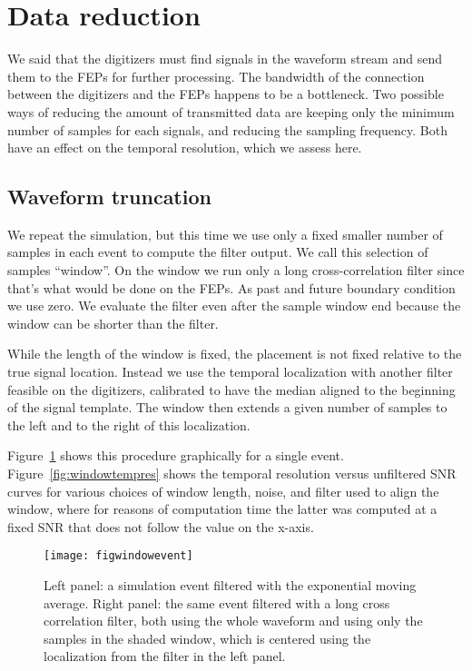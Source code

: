 \section{Data reduction}

We said that the digitizers must find signals in the waveform stream and send
them to the FEPs for further processing. The bandwidth of the connection
between the digitizers and the FEPs happens to be a bottleneck. Two possible
ways of reducing the amount of transmitted data are keeping only the minimum
number of samples for each signals, and reducing the sampling frequency. Both
have an effect on the temporal resolution, which we assess here.

\subsection{Waveform truncation}

We repeat the simulation, but this time we use only a fixed smaller number of
samples in each event to compute the filter output. We call this selection of
samples ``window''. On the window we run only a long cross-correlation filter
since that's what would be done on the FEPs. As past and future boundary
condition we use zero. We evaluate the filter even after the sample window end
because the window can be shorter than the filter.

While the length of the window is fixed, the placement is not fixed relative to
the true signal location. Instead we use the temporal localization with another
filter feasible on the digitizers, calibrated to have the median aligned to the
beginning of the signal template. The window then extends a given number of
samples to the left and to the right of this localization.

Figure~\ref{fig:windowevent} shows this procedure graphically for a single
event. Figure~\ref{fig:windowtempres} shows the temporal resolution versus
unfiltered SNR curves for various choices of window length, noise, and filter
used to align the window, where for reasons of computation time the latter was
computed at a fixed SNR that does not follow the value on the x-axis.

\begin{figure}
    \hspace{-0.20\textwidth}
    \texttt{[image: figwindowevent]}
    
    \caption{Left panel: a simulation event filtered with the exponential
    moving average. Right panel: the same event filtered with a long cross
    correlation filter, both using the whole waveform and using only the
    samples in the shaded window, which is centered using the localization from
    the filter in the left panel.}
    
    \label{fig:windowevent}
\end{figure}

